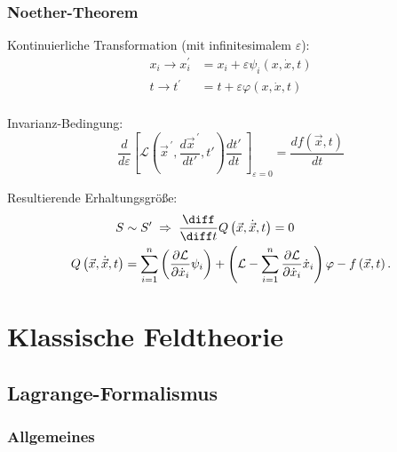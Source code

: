 \documentclass[11pt]{article}
\numberwithin{equation}{section}
\begin{document}
      \subsubsection{Noether-Theorem}
        Kontinuierliche Transformation (mit infinitesimalem $\varepsilon$):
        \begin{equation}
          \begin{aligned}
          x_i \rightarrow x_{i}^{\prime} &= x_i+\varepsilon\psi_i\left(x,\dot{x},t\right) \\
            t\rightarrow t^{\prime}\, &= t+\varepsilon\varphi\left(x,\dot{x},t\right) \\
          \end{aligned}
        \end{equation}

        Invarianz-Bedingung:
        \begin{equation}
          \frac{d}{d\varepsilon}\left[\mathcal{L}\left( {\vec{x}}^{\,\prime},\frac{d {\vec{x}}^{\,\prime}}{dt'},t'\right) \frac{dt'}{dt}\,\right]_{\varepsilon=0}=\frac{df(\vec{x}, t)}{dt}
        \end{equation}

        Resultierende Erhaltungsgröße:
        \begin{equation}
          \begin{aligned}
            S &\sim S' \;\Rightarrow\;
            \tder{}{t} Q\left(\vec{x},\dot{\vec{x}},t\right) = 0 \\
            Q\left(\vec{x},\dot{\vec{x}},t\right) &= \sum_{i=1}^{n}\left(\frac{\partial\mathcal{L}}{\partial{\dot{x}}_i}\psi_i\right)+\left(\mathcal{L}-\sum_{i=1}^{n}{\frac{\partial\mathcal{L}}{\partial{\dot{x}}_i}{\dot{x}}_i}\right)\varphi - f\left(\vec{x},t\right).
          \end{aligned}
        \end{equation}

  \newpage
	\section{Klassische Feldtheorie}
    \subsection{Lagrange-Formalismus}
      \subsubsection{Allgemeines}
\end{document}
